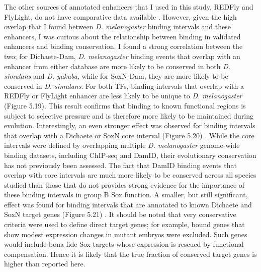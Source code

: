 The other sources of annotated enhancers that I used in this study, REDFly and FlyLight, do not have comparative data available \citep{gallo_redfly_2010,manning_resource_2012}. However, given the high overlap that I found between \emph{D. melanogaster} binding intervals and these enhancers, I was curious about the relationship between binding in validated enhancers and binding conservation. I found a strong correlation between the two; for Dichaete-Dam, \emph{D. melanogaster} binding events that overlap with an enhancer from either database are more likely to be conserved in both \emph{D. simulans} and \emph{D. yakuba}, while for SoxN-Dam, they are more likely to be conserved in \emph{D. simulans}. For both TFs, binding intervals that overlap with a REDFly or FlyLight enhancer are less likely to be unique to \emph{D. melanogaster} (Figure 5.19). This result confirms that binding to known functional regions is subject to selective pressure and is therefore more likely to be maintained during evolution. Interestingly, an even stronger effect was observed for binding intervals that overlap with a Dichaete or SoxN core interval (Figure 5.20) \citep{aleksic_role_2013,ferrero_soxneuro_2014}. While the core intervals were defined by overlapping multiple \emph{D. melanogaster} genome-wide binding datasets, including ChIP-seq and DamID, their evolutionary conservation has not previously been assessed. The fact that DamID binding events that overlap with core intervals are much more likely to be conserved across all species studied than those that do not provides strong evidence for the importance of these binding intervals in group B Sox function. A smaller, but still significant, effect was found for binding intervals that are annotated to known Dichaete and SoxN target genes (Figure 5.21) \citep{aleksic_role_2013,ferrero_soxneuro_2014}. It should be noted that very conservative criteria were used to define direct target genes; for example, bound genes that show modest expression changes in mutant embryos were excluded. Such genes would include bona fide Sox targets whose expression is rescued by functional compensation. Hence it is likely that the true fraction of conserved target genes is higher than reported here.\\


